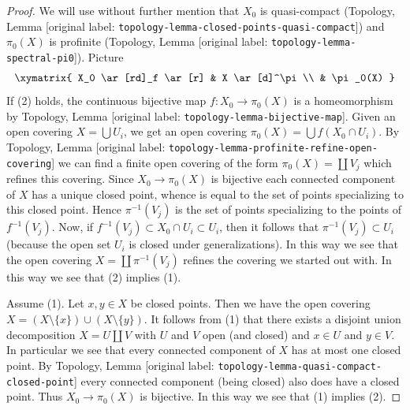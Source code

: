 \documentclass[10pt,a4paper]{article}
\theoremstyle{plain}
\theoremstyle{definition}
\theoremstyle{remark}
\numberwithin{equation}{subsection}
\begin{document}
\begin{proof}
We will use without further mention that
$X_0$ is quasi-compact
(Topology, Lemma \textnormal{[original label: \nolinkurl{topology-lemma-closed-points-quasi-compact}]})
and $\pi_0(X)$ is profinite
(Topology, Lemma \textnormal{[original label: \nolinkurl{topology-lemma-spectral-pi0}]}).
Picture
$$
\xymatrix{
X_0 \ar[rd]_f \ar[r] & X \ar[d]^\pi \\
& \pi_0(X)
}
$$
If (2) holds, the continuous bijective map $f : X_0 \to \pi_0(X)$ is
a homeomorphism by
Topology, Lemma \textnormal{[original label: \nolinkurl{topology-lemma-bijective-map}]}.
Given an open covering $X = \bigcup U_i$, we get an open covering
$\pi_0(X) = \bigcup f(X_0 \cap U_i)$. By
Topology, Lemma \textnormal{[original label: \nolinkurl{topology-lemma-profinite-refine-open-covering}]}
we can find a finite open covering of the form $\pi_0(X) = \coprod V_j$
which refines this covering.
Since $X_0 \to \pi_0(X)$ is bijective each connected component of
$X$ has a unique closed point, whence is equal to the set of points
specializing to this closed point. Hence $\pi^{-1}(V_j)$ is the
set of points specializing to the points of $f^{-1}(V_j)$.
Now, if $f^{-1}(V_j) \subset X_0 \cap U_i \subset U_i$, then
it follows that $\pi^{-1}(V_j) \subset U_i$ (because the open set
$U_i$ is closed under generalizations). In this way we see
that the open covering $X = \coprod \pi^{-1}(V_j)$ refines
the covering we started out with. In this way we see that
(2) implies (1).

\medskip\noindent
Assume (1). Let $x, y \in X$ be closed points. Then we have the open covering
$X = (X \setminus \{x\}) \cup (X \setminus \{y\})$.
It follows from (1) that there exists a disjoint union decomposition
$X = U \amalg V$ with $U$ and $V$ open (and closed) and $x \in U$ and
$y \in V$. In particular we see that every connected component of $X$
has at most one closed point. By
Topology, Lemma \textnormal{[original label: \nolinkurl{topology-lemma-quasi-compact-closed-point}]}
every connected component (being closed) also does have a closed point.
Thus $X_0 \to \pi_0(X)$ is bijective. In this way we see that (1) implies (2).


\end{proof}
\end{document}
